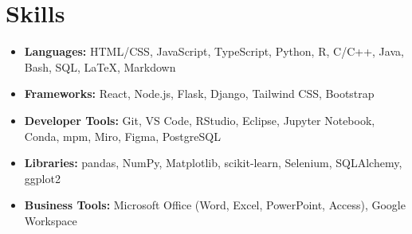 \documentclass{article}
\begin{document}
\section{Skills}
\begin{itemize}[itemsep=-2pt]
    \item \textbf{Languages:} HTML/CSS, JavaScript, TypeScript, Python, R, C/C++, Java, Bash, SQL, LaTeX, Markdown
    \item \textbf{Frameworks:} React, Node.js, Flask, Django, Tailwind CSS, Bootstrap
    \item\textbf{Developer Tools:} Git, VS Code, RStudio, Eclipse, Jupyter Notebook, Conda, mpm, Miro, Figma, PostgreSQL
    \item \textbf{Libraries:} pandas, NumPy, Matplotlib, scikit-learn, Selenium, SQLAlchemy, ggplot2
    \item \textbf{Business Tools:} Microsoft Office (Word, Excel, PowerPoint, Access), Google Workspace
\end{itemize}
\end{document}
